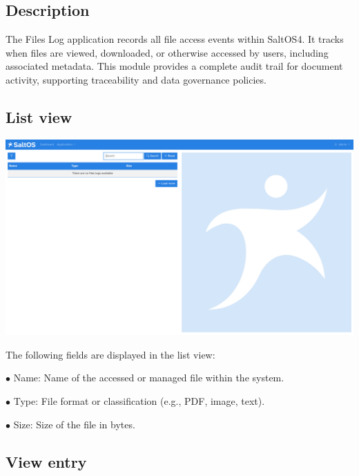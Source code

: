 \documentclass[a4paper]{article}
\begin{document}
\hypertarget{toc17}{}
\subsection{Description}

The Files Log application records all file access events within SaltOS4.
It tracks when files are viewed, downloaded, or otherwise accessed by users, including associated metadata.
This module provides a complete audit trail for document activity, supporting traceability and data governance policies.

\hypertarget{toc18}{}
\subsection{List view}

\begin{center}\includegraphics[width=1\textwidth]{../ujest/snaps/test-screenshots-js-screenshots-common-fileslog-list-en-us-1-snap.png}\end{center}

The following fields are displayed in the list view:

\begin{compactitem}
\item[\color{myblue}$\bullet$] Name: Name of the accessed or managed file within the system.
\item[\color{myblue}$\bullet$] Type: File format or classification (e.g., PDF, image, text).
\item[\color{myblue}$\bullet$] Size: Size of the file in bytes.
\end{compactitem}

\hypertarget{toc19}{}
\subsection{View entry}
\end{document}
